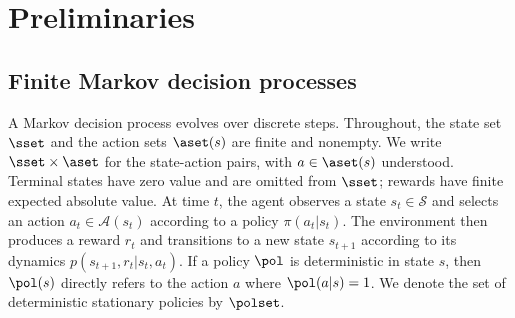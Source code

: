 \section{Preliminaries}
\label{sec: mcopi}


\subsection{Finite Markov decision processes}




A Markov decision process evolves over discrete steps.
Throughout, the state set $\sset$ and the action sets $\aset(s)$ are finite and nonempty. We write $\sset\times\aset$ for the state-action pairs, with $a\in\aset(s)$ understood. Terminal states have zero value and are omitted from $\sset$; rewards have finite expected absolute value.
At time \(t\), the agent observes a state \(s_t \in \mathcal S\) and selects an action \(a_t \in \mathcal A(s_t)\) according to a policy \(\pi(a_t | s_t)\).
The environment then produces a reward \(r_t\) and transitions to a new state \(s_{t+1}\) according to its dynamics $p(s_{t+1}, r_t | s_t, a_t)$.
If a policy $\pol$ is deterministic in state $s$, then $\pol(s)$ directly refers to the action $a$ where $\pol(a | s) = 1$.
We denote the set of deterministic stationary policies by $\polset$.

